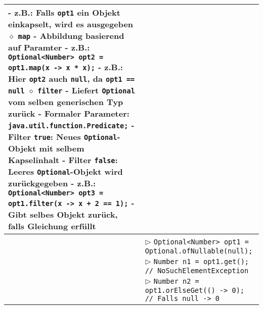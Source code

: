 \begin{tabular}{ | p{} p{} | }
{	\hspace{0.6cm} - z.B.: Falls \texttt{opt1} ein Objekt einkapselt, wird es ausgegeben \\
	\hspace{0.4cm} $\diamond$ \texttt{map} \\
	\hspace{0.6cm} - Abbildung basierend auf Paramter \\
	\hspace{0.6cm} - z.B.: \texttt{Optional<Number> opt2 = opt1.map(x -> x * x);} \\
	\hspace{0.6cm} - z.B.: Hier \texttt{opt2} auch \texttt{null}, da \texttt{opt1 == null} \\
	\hspace{0.4cm} $\diamond$ \texttt{filter} \\
	\hspace{0.6cm} - Liefert \texttt{Optional} vom selben generischen Typ zurück \\
	\hspace{0.6cm} - Formaler Parameter: \texttt{java.util.function.Predicate;} \\
	\hspace{0.6cm} - Filter \texttt{true}: Neues \texttt{Optional}-Objekt mit selbem Kapselinhalt \\ 
	\hspace{0.6cm} - Filter \texttt{false}: Leeres \texttt{Optional}-Objekt wird zurückgegeben \\
	\hspace{0.6cm} - z.B.: \texttt{Optional<Number> opt3 = opt1.filter(x -> x + 2 == 1);} \\
	\hspace{0.6cm} - Gibt selbes Objekt zurück, falls Gleichung erfüllt } \\ \hline

	\makecell[l]{Beispiel} & \makecell[l]{
	$\rhd$ \texttt{Optional<Number> opt1 = Optional.ofNullable(null);} \\
	$\rhd$ \texttt{Number n1 = opt1.get(); // NoSuchElementException} \\
	$\rhd$ \texttt{Number n2 = opt1.orElseGet(() -> 0); // Falls null -> 0}  } \\ \hline
	
	\end{tabular}

